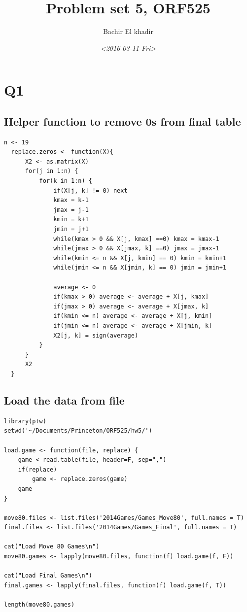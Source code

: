 \documentclass[11pt]{article}
\author{Bachir El khadir}
\date{\textit{<2016-03-11 Fri>}}
\title{Problem set 5, ORF525}
\begin{document}
\maketitle
\begin{HTML}

\label{orgspecialblock1}

\end{HTML}


\section{Q1}
\label{sec:orgheadline3}

\subsection{Helper function to remove 0s from final table}
\label{sec:orgheadline1}

\begin{verbatim}
n <- 19
  replace.zeros <- function(X){
      X2 <- as.matrix(X)
      for(j in 1:n) {
          for(k in 1:n) {
              if(X[j, k] != 0) next
              kmax = k-1
              jmax = j-1
              kmin = k+1
              jmin = j+1
              while(kmax > 0 && X[j, kmax] ==0) kmax = kmax-1
              while(jmax > 0 && X[jmax, k] ==0) jmax = jmax-1
              while(kmin <= n && X[j, kmin] == 0) kmin = kmin+1
              while(jmin <= n && X[jmin, k] == 0) jmin = jmin+1

              average <- 0
              if(kmax > 0) average <- average + X[j, kmax]
              if(jmax > 0) average <- average + X[jmax, k]
              if(kmin <= n) average <- average + X[j, kmin]
              if(jmin <= n) average <- average + X[jmin, k]
              X2[j, k] = sign(average)
          }
      }
      X2
  }
\end{verbatim}







\subsection{Load the data from file}
\label{sec:orgheadline2}
\begin{verbatim}
library(ptw)
setwd('~/Documents/Princeton/ORF525/hw5/')

load.game <- function(file, replace) {
    game <-read.table(file, header=F, sep=",")
    if(replace)
        game <- replace.zeros(game)
    game
}

move80.files <- list.files('2014Games/Games_Move80', full.names = T)
final.files <- list.files('2014Games/Games_Final', full.names = T)

cat("Load Move 80 Games\n")
move80.games <- lapply(move80.files, function(f) load.game(f, F))

cat("Load Final Games\n")
final.games <- lapply(final.files, function(f) load.game(f, T))

length(move80.games)
\end{verbatim}
\end{document}
